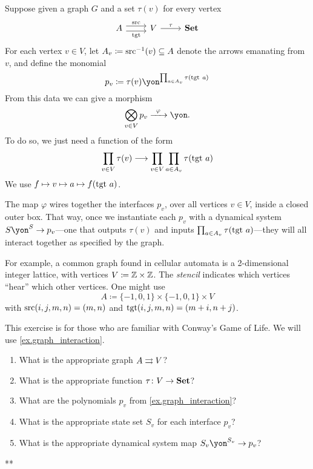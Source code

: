 \documentclass[Book-Poly]{subfiles}
\begin{document}
\begin{example}\label{ex.graph_interaction}
Suppose given a graph $G$ and a set $\tau(v)$ for every vertex
\[
\begin{tikzcd}
	A\ar[r, shift left=3pt, "\src"]\ar[r, shift right=3pt, "\tgt"']&
	V\ar[r, "\tau"]&
	\smset
\end{tikzcd}
\]
For each vertex $v\in V$, let $A_v\coloneqq\mathrm{src}^{-1}(v)\subseteq A$ denote the arrows emanating from $v$, and define the monomial
\[
	p_v\coloneqq\tau(v)\yon^{\prod_{a\in A_v}\tau(\tgt\ a)}
\]
From this data we can give a morphism
\[
\bigotimes_{v\in V}p_v\Too{\varphi}\yon.
\]
To do so, we just need a function of the form
\[
\prod_{v\in V}\tau(v)\longrightarrow\prod_{v\in V}\prod_{a\in A_v}\tau(\mathrm{tgt}\ a)
\]
We use $f\mapsto v\mapsto a\mapsto f(\mathrm{tgt}\ a)$.

The map $\varphi$ wires together the interfaces $p_v$, over all vertices $v\in V$, inside a closed outer box. That way, once we instantiate each $p_v$ with a dynamical system $S\yon^S\to p_v$---one that outputs $\tau(v)$ and inputs $\prod_{a\in A_v}\tau(\tgt\ a)$---they will all interact together as specified by the graph.

For example, a common graph found in cellular automata is a 2-dimensional integer lattice, with vertices $V\coloneqq\mathbb{Z}\times\mathbb{Z}$. The \emph{stencil} indicates which vertices ``hear'' which other vertices. One might use
\[A\coloneqq\{-1,0,1\}\times\{-1,0,1\}\times V\]
with $\mathrm{src}(i,j,m,n)=(m,n)$ and $\mathrm{tgt}(i,j,m,n)=(m+i, n+j)$.
\end{example}

\begin{exercise}\label{exc.conway}
This exercise is for those who are familiar with Conway's Game of Life. We will use \cref{ex.graph_interaction}.
\begin{enumerate}
	\item What is the appropriate graph $A\rightrightarrows V$?
	\item What is the appropriate function $\tau\colon V\to\mathbf{Set}$?
	\item What are the polynomials $p_v$ from \cref{ex.graph_interaction}?
	\item What is the appropriate state set $S_v$ for each interface $p_v$?
	\item What is the appropriate dynamical system map $S_v\yon^{S_v}\to p_v$?
\qedhere
\end{enumerate}
\begin{solution}
**
\end{solution}
\end{exercise}
\end{document}
